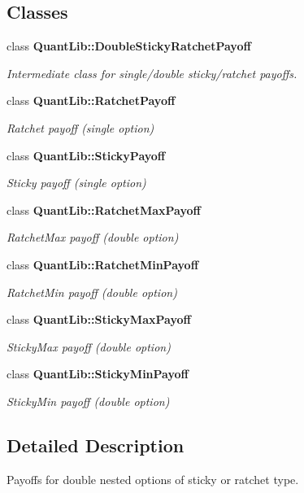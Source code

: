 \subsection*{Classes}
\begin{DoxyCompactItemize}
\item 
class {\bf Quant\+Lib\+::\+Double\+Sticky\+Ratchet\+Payoff}
\begin{DoxyCompactList}\small\item\em Intermediate class for single/double sticky/ratchet payoffs. \end{DoxyCompactList}\item 
class {\bf Quant\+Lib\+::\+Ratchet\+Payoff}
\begin{DoxyCompactList}\small\item\em Ratchet payoff (single option) \end{DoxyCompactList}\item 
class {\bf Quant\+Lib\+::\+Sticky\+Payoff}
\begin{DoxyCompactList}\small\item\em Sticky payoff (single option) \end{DoxyCompactList}\item 
class {\bf Quant\+Lib\+::\+Ratchet\+Max\+Payoff}
\begin{DoxyCompactList}\small\item\em Ratchet\+Max payoff (double option) \end{DoxyCompactList}\item 
class {\bf Quant\+Lib\+::\+Ratchet\+Min\+Payoff}
\begin{DoxyCompactList}\small\item\em Ratchet\+Min payoff (double option) \end{DoxyCompactList}\item 
class {\bf Quant\+Lib\+::\+Sticky\+Max\+Payoff}
\begin{DoxyCompactList}\small\item\em Sticky\+Max payoff (double option) \end{DoxyCompactList}\item 
class {\bf Quant\+Lib\+::\+Sticky\+Min\+Payoff}
\begin{DoxyCompactList}\small\item\em Sticky\+Min payoff (double option) \end{DoxyCompactList}\end{DoxyCompactItemize}


\subsection{Detailed Description}
Payoffs for double nested options of sticky or ratchet type. 

